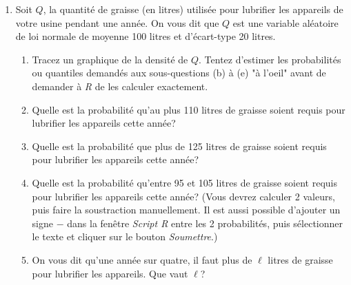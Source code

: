 \documentclass[12pt]{article}
\begin{document}
\begin{enumerate}

\item Soit $Q$, la quantité  de graisse (en litres) utilisée pour lubrifier les appareils de votre usine pendant une année. On vous dit que $Q$ est une variable aléatoire de loi normale de moyenne 100 litres et d'écart-type 20 litres.
\begin{enumerate}
\item Tracez un graphique de la densité de $Q$. %
    Tentez d'estimer les probabilités ou quantiles demandés aux sous-questions (b) à (e)  "à l'oeil" avant de demander à {\it R} de les calculer exactement.
\item Quelle est la probabilité qu'au plus 110 litres de graisse soient requis pour lubrifier les appareils cette année?
\item Quelle est la probabilité que plus de 125 litres de graisse soient requis pour lubrifier les appareils cette année?
\item Quelle est la probabilité qu'entre 95 et 105 litres de graisse soient requis pour lubrifier les appareils cette année? (Vous devrez calculer 2 valeurs, puis faire la soustraction manuellement. Il est aussi possible d'ajouter un signe $-$ dans la fenêtre {\it Script R} entre les 2 probabilités, puis sélectionner le texte et cliquer sur le bouton {\it Soumettre}.)
\item On vous dit qu'une année sur quatre, il faut plus de $\ell$ litres de graisse pour lubrifier les appareils. Que vaut $\ell$?
\end{enumerate}


\newpage

{\ }

\vspace{3mm}


\end{enumerate}
\end{document}
